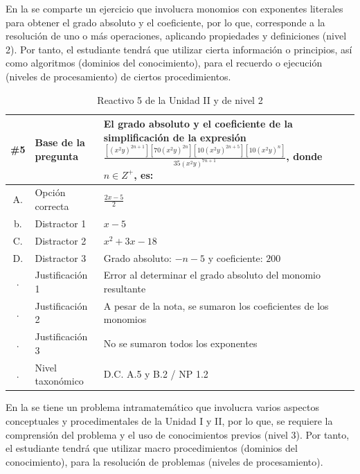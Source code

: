 \documentclass[spanish]{textolivre}
\begin{document}
En la  se comparte un ejercicio que involucra monomios con exponentes literales para obtener el grado absoluto y el coeficiente, por lo que, corresponde a la resolución de uno o más operaciones, aplicando propiedades y definiciones (nivel 2). Por tanto, el estudiante tendrá que utilizar cierta información o principios, así como algoritmos (dominios del conocimiento), para el recuerdo o ejecución (niveles de procesamiento) de ciertos procedimientos.

\begin{table}[h!]
\caption{Reactivo 5 de la Unidad II y de nivel 2} %
\centering %
\begin{tabular} { c p{4cm} p{9cm} } %
\hline %
\#5 & Base de la pregunta & El grado absoluto y el coeficiente de la simplificación de la expresión $\frac{[(x^2y)^{2n+1}][70(x^2y)^{2n}][10(x^2y)^{2n+5}][10(x^2y)^n]}{35(x^2y)^{7n+1}}$, donde $n \in Z^{+}$, es: \\ [0.4ex] %
\hline %
A.  & Opción correcta &$\frac{2x-5}{2}$\\%
b. & Distractor 1 & $x-5$ \\
C. & Distractor 2 & $x^2+3x-18$\\
D. & Distractor 3 & Grado absoluto: $-n-5$ y coeficiente: $200$\\
. & Justificación 1 & Error al determinar el grado absoluto del monomio resultante \\
. & Justificación 2 & A pesar de la nota, se sumaron los coeficientes de los monomios \\
. & Justificación 3 & No se sumaron todos los exponentes \\
. & Nivel taxonómico & D.C. A.5 y B.2 / NP 1.2\\
\hline
\end{tabular}
\label{tbl03} %
\end{table}

En la  se tiene un problema intramatemático que involucra varios aspectos conceptuales y procedimentales de la Unidad I y II, por lo que, se requiere la comprensión del problema y el uso de conocimientos previos (nivel 3). Por tanto, el estudiante tendrá que utilizar macro procedimientos (dominios del conocimiento), para la resolución de problemas (niveles de procesamiento). 
\end{document}
